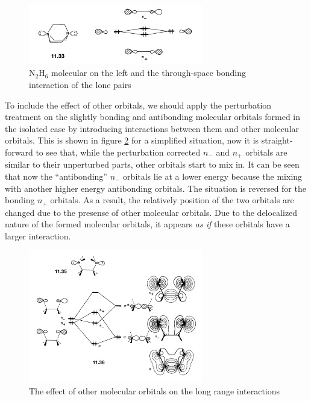 \documentclass{article}
\begin{document}
\begin{figure}
    \centering
    \includegraphics[width=3in]{figures/F_non_interacting_lone_pair.png}
    \caption{N$_2$H$_6$ molecular on the left and the through-space bonding interaction of the lone pairs}
    \label{F:N2H6_lone_pairs}
\end{figure}

To include the effect of other orbitals, we should apply the perturbation treatment on the slightly bonding and antibonding 
molecular orbitals formed in the isolated case by introducing interactions between them and other molecular orbitals. This 
is shown in figure \ref{F:through-bond} for a simplified situation, now it is straight-forward to see that, while the 
perturbation corrected $n_-$ and $n_+$ orbitals are similar to their unperturbed parts, other orbitals start to 
mix in. It can be seen that now the ``antibonding'' $n_-$ orbitals lie at a lower energy because the mixing with 
another higher energy antibonding orbitals. The situation is reversed for the bonding $n_+$ orbitals. As a result, 
the relatively position of the two orbitals are changed due to the presense of other molecular orbitals. Due to the delocalized 
nature of the formed molecular orbitals, it appears \emph{as if} these orbitals have a larger interaction.

\begin{figure}
    \centering
    \includegraphics[width=3in]{figures/F_through_bond.png}
    \caption{The effect of other molecular orbitals on the long range interactions}
    \label{F:through-bond}
\end{figure}
\end{document}
